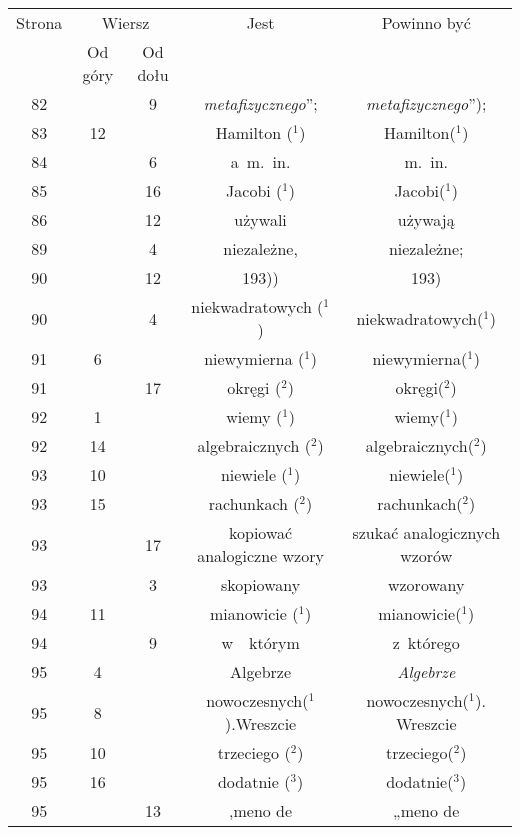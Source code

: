 \documentclass[a4paper,11pt]{article}
\numberwithin{equation}{section}
\begin{document}
\begin{center}
  \newpage

  \begin{tabular}{|c|c|c|c|c|}
    \hline
    Strona & \multicolumn{2}{c|}{Wiersz} & Jest
                              & Powinno być \\ \cline{2-3}
    & Od góry & Od dołu & & \\
    \hline
    82  & &  9 & \textit{metafizycznego}”; & \textit{metafizycznego}”); \\
    83  & 12 & & Hamilton ($^{ 1 }$) & Hamilton($^{ 1 }$) \\
    84  & &  6 & a~m.~in. & m.~in. \\
    85  & & 16 & Jacobi ($^{ 1 }$) & Jacobi($^{ 1 }$) \\
    86  & & 12 & używali & używają \\
    89  & &  4 & niezależne, & niezależne; \\
    90  & & 12 & 193)) & 193) \\
    90  & &  4 & niekwadratowych ($^{ 1 }$) & niekwadratowych($^{ 1 }$) \\
    91  &  6 & & niewymierna ($^{ 1 }$) & niewymierna($^{ 1 }$) \\
    91  & & 17 & okręgi ($^{ 2 }$) & okręgi($^{ 2 }$) \\
    92  &  1 & & wiemy ($^{ 1 }$) & wiemy($^{ 1 }$) \\
    92  & 14 & & algebraicznych ($^{ 2 }$) & algebraicznych($^{ 2 }$) \\
    93  & 10 & & niewiele ($^{ 1 }$) & niewiele($^{ 1 }$) \\
    93  & 15 & & rachunkach ($^{ 2 }$) & rachunkach($^{ 2 }$) \\
    93  & & 17 & kopiować analogiczne wzory & szukać analogicznych
                                              wzorów \\
    93  & &  3 & skopiowany & wzorowany \\
    94  & 11 & & mianowicie ($^{ 1 }$) & mianowicie($^{ 1 }$) \\
    94  & &  9 & w~~którym & z~którego \\
    95  &  4 & & Algebrze & \textit{Algebrze} \\
    95  &  8 & & nowoczesnych($^{ 1 }$).Wreszcie
           & nowoczesnych($^{ 1 }$). Wreszcie \\
    95  & 10 & & trzeciego ($^{ 2 }$) & trzeciego($^{ 2 }$) \\
    95  & 16 & & dodatnie ($^{ 3 }$) & dodatnie($^{ 3 }$) \\
    95  & & 13 & ,meno de & „meno de \\

\end{tabular}
\end{center}
\end{document}
